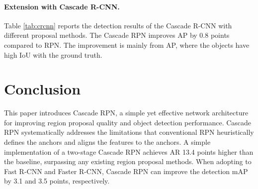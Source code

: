 \documentclass{article}
\begin{document}
	\paragraph{Extension with Cascade R-CNN.} Table \ref{tab:crcnn} reports the detection results of the Cascade R-CNN \cite{Cai_2018_CVPR} with different proposal methods. The Cascade RPN improves AP by 0.8 points compared to RPN. The improvement is mainly from AP, where the objects have high IoU with the ground truth.
	
	\section{Conclusion}
	This paper introduces Cascade RPN, a simple yet effective network architecture for improving region proposal quality and object detection performance. Cascade RPN systematically addresses the limitations that conventional RPN heuristically defines the anchors and aligns the features to the anchors. A simple implementation of a two-stage Cascade RPN achieves AR 13.4 points higher than the baseline, surpassing any existing region proposal methods. When adopting to Fast R-CNN and Faster R-CNN, Cascade RPN can improve the detection mAP by 3.1 and 3.5 points, respectively. 
	
\end{document}
